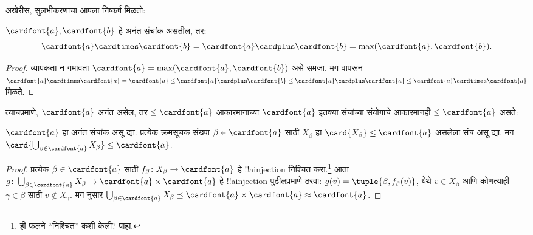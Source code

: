 \documentclass[../../../include/open-logic-section]{subfiles}
\begin{document}
अखेरीस, सुलभीकरणाचा आपला निष्कर्ष मिळतो:

\begin{thm}
$\cardfont{a}, \cardfont{b}$ हे अनंत संचांक असतील, तर:
\[
  \cardfont{a}
\cardtimes \cardfont{b} = \cardfont{a} \cardplus \cardfont{b} =
\text{max}(\cardfont{a}, \cardfont{b}).
\]
\end{thm}

\begin{proof}
व्यापकता न गमावता $\cardfont{a} = \max(\cardfont{a},
\cardfont{b})$ असे समजा. मग  वापरून
$\cardfont{a}\cardtimes\cardfont{a} = \cardfont{a} \leq \cardfont{a}
\cardplus \cardfont{b} \leq \cardfont{a} \cardplus \cardfont{a} \leq
\cardfont{a} \cardtimes \cardfont{a}$ मिळते. \end{proof}\noindent त्याचप्रमाणे,
$\cardfont{a}$ अनंत असेल, तर $\leq\cardfont{a}$ आकारमानाच्या $\cardfont{a}$ इतक्या संचांच्या संयोगाचे आकारमानही $\leq\cardfont{a}$ असते:

\begin{prop}
$\cardfont{a}$ हा अनंत संचांक असू द्या. प्रत्येक क्रमसूचक संख्या $\beta
\in \cardfont{a}$ साठी $X_\beta$ हा $\card{X_\beta} \leq
\cardfont{a}$ असलेला संच असू द्या. मग $\card{\bigcup_{\beta \in \cardfont{a}} X_\beta}
\leq \cardfont{a}$.
\end{prop}

\begin{proof}
प्रत्येक $\beta \in \cardfont{a}$ साठी $f_\beta \colon
X_\beta \to \cardfont{a}$ हे !!a{injection} निश्चित करा.\footnote{ही फलने “निश्चित” कशी केली?  पाहा.} आता $g \colon
\bigcup_{\beta \in \cardfont{a}} X_\beta \to \cardfont{a} \times
\cardfont{a}$ हे !!a{injection} पुढीलप्रमाणे ठरवा: $g(v) = \tuple{\beta, f_\beta(v)}$, येथे $v \in
X_\beta$ आणि कोणत्याही $\gamma \in \beta$ साठी $v \notin X_\gamma$. मग
 नुसार
$\bigcup_{\beta \in \cardfont{a}} X_\beta \preceq \cardfont{a} \times
\cardfont{a} \approx \cardfont{a}$.
\end{proof}
\end{document}
